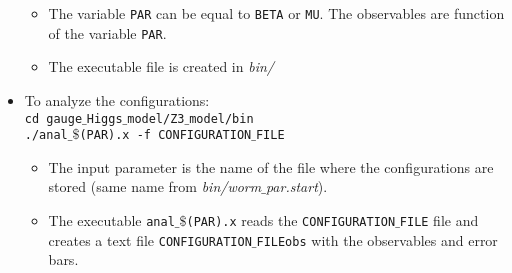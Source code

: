 \documentclass[a4paper,10pt]{report}
\begin{document}
\begin{itemize}[leftmargin=*]
 \begin{itemize}[leftmargin=*]
  \item The variable {\tt PAR} can be equal to {\tt BETA} or {\tt MU}.
  The observables are function of the variable {\tt PAR}.
  \item The executable file is created in {\it bin/}
 \end{itemize}
 
 \item To analyze the configurations:
 \vspace*{2mm}
 \texttt{
 \\cd gauge$\_$Higgs$\_$model/Z3$\_$model/bin
 \\./anal$\_\$$(PAR).x -f CONFIGURATION$\_$FILE
 }

 \begin{itemize}[leftmargin=*]
  \item The input parameter is the name of the file where the configurations are stored (same
  name from {\it bin/worm$\_$par.start}).
  \item The executable {\tt anal$\_\$$(PAR).x} reads the {\tt CONFIGURATION$\_$FILE} file 
  and creates a text file {\tt CONFIGURATION$\_$FILEobs} with the observables and error bars.
 \end{itemize}

\end{itemize}
\end{document}
